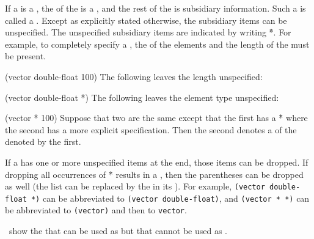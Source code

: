 
\indent               
If a  is a , the  of the  
is a , and the rest of the  is subsidiary
 information.  Such a  is called 
a .
Except as explicitly stated otherwise,
the subsidiary items can be unspecified.
The unspecified subsidiary items are indicated
by writing \f{*}.  For example, to completely specify
a , the  of the elements
and the length of the  must be present.

\code
 (vector double-float 100)
\endcode
The following leaves the length unspecified:

\code
 (vector double-float *)
\endcode
The following leaves the element type unspecified:

\code
 (vector * 100)                                      
\endcode
Suppose that two  are the same except that the first
has a \f{*} where the second has a more explicit specification.
Then the second denotes a  
of the  denoted by the first.

If a  has one or more unspecified items at the end, 
those items can be dropped.
If dropping all occurrences of \f{*} results in a  ,
then the parentheses can be dropped as well (the list can be replaced
by the  in its ).  
For example,                       
{\tt (vector double-float *)}                    
can be abbreviated to {\tt (vector double-float)},               
and {\tt (vector * *)} can be abbreviated to {\tt (vector)} 
and then to 
{\tt vector}.


\Thenextfigure\ show the  that can be used as 
 
but that cannot be used as .

